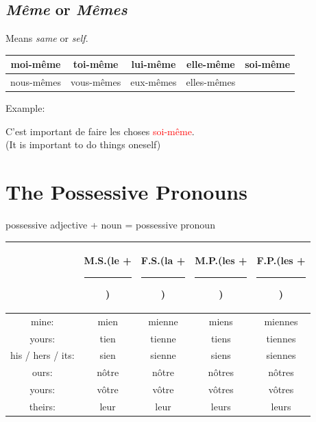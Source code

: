 \documentclass{book}
\begin{document}
        \subsection{\textit{Même} or \textit{Mêmes}}
            Means \textit{same} or \textit{self}.
            \begin{center}
                \begin{tabular}{|c|c|c|c|c|}
                    \hline
                    moi-même & toi-même & lui-même & elle-même & soi-même \\
                    \hline
                    nous-mêmes & vous-mêmes & eux-mêmes & elles-mêmes & \\
                    \hline
                \end{tabular}
            \end{center}
            Example:
            \begin{center}
                C'est important de faire les choses \textcolor{red}{soi-même}. \\
                (It is important to do things oneself)
            \end{center}
    
    \section{The Possessive Pronouns}
        possessive adjective + noun = possessive pronoun
        \begin{center}
            \begin{tabular}{|c|c|c|c|c|}
                \hline
                & \textbf{M.S.}(le + \rule{0.5cm}{0.1mm}) & \textbf{F.S.}(la + \rule{0.5cm}{0.1mm}) & \textbf{M.P.}(les + \rule{0.5cm}{0.1mm}) & \textbf{F.P.}(les + \rule{0.5cm}{0.1mm}) \\
                \hline
                mine: & mien & mienne & miens & miennes \\
                \hline
                yours: & tien & tienne & tiens & tiennes \\
                \hline
                his / hers / its: & sien & sienne & siens & siennes \\
                \hline
                ours: & nôtre & nôtre & nôtres & nôtres \\
                \hline
                yours: & vôtre & vôtre & vôtres & vôtres \\
                \hline
                theirs: & leur & leur & leurs & leurs \\
                \hline
            \end{tabular}
        \end{center}
\end{document}
